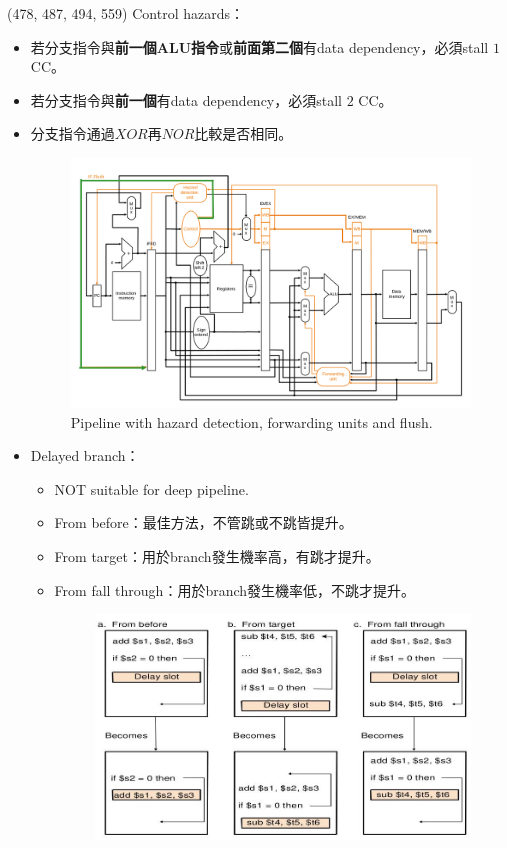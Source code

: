 \item \begin{theorem}{(478, 487, 494, 559)} Control hazards：\begin{itemize}
        \item 若分支指令與\textbf{前一個ALU指令}或\textbf{前面第二個}有data dependency，必須stall $1$ CC。
        \item 若分支指令與\textbf{前一個}有data dependency，必須stall $2$ CC。
        \item 分支指令通過$XOR$再$NOR$比較是否相同。
        \begin{figure}[H]
            \centering
            \includegraphics[scale=0.3]{img/pipeline-flush.png}
            \caption{Pipeline with hazard detection, forwarding units and flush.}
            \label{img:pipeline-flush}
        \end{figure}
        \item Delayed branch：\begin{itemize}
            \item NOT suitable for deep pipeline.
            \item From before：最佳方法，不管跳或不跳皆提升。
            \item From target：用於branch發生機率高，有跳才提升。
            \item From fall through：用於branch發生機率低，不跳才提升。
            \begin{figure}[H]
                \centering
                \includegraphics[scale=0.6]{img/delayed-branch.jpg}

\end{figure}
\end{itemize}
\end{itemize}
\end{theorem}
